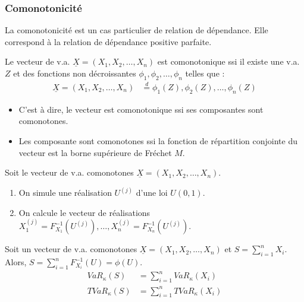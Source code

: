 \documentclass[10pt, french]{article}
\begin{document}
\begin{multicols*}{2}
\subsubsection{Comonotonicité}
La comonotonicité est un cas particulier de relation de dépendance. Elle correspond à la relation de dépendance positive parfaite.
\begin{definitionNOHFILLprop}[Comonotonicité]
Le vecteur de v.a. $\underline{X}	=	(X_{1}, X_{2}, \dots, X_{n})$ est comonotonique ssi il existe une v.a. $Z$ et des fonctions non décroissantes $\phi_{1}, \phi_{2}, \dots, \phi_{n}$ telles que :
\begin{align*}
	\underline{X}	
	=	(X_{1}, X_{2}, \dots, X_{n})
	&\overset{d}{=}	\phi_{1}(Z), \phi_{2}(Z), \dots, \phi_{n}(Z)
\end{align*}
\begin{itemize}
	\item	C'est à dire, le vecteur est comonotonique ssi ses composantes sont comonotones.
	\item	Les composante sont comonotones ssi la fonction de répartition conjointe du vecteur est la borne supérieure de Fréchet $M$.
\end{itemize}
\end{definitionNOHFILLprop}

\begin{algo2}
Soit le vecteur de v.a. comonotones $\underline{X}	=	(X_{1}, X_{2}, \dots, X_{n})$.
\begin{enumerate}
	\item	On simule une réalisation $U^{(j)}$ d'une loi $U(0, 1)$.
	\item	On calcule le vecteur de réalisations $X^{(j)}_{1}	=	F_{X_{1}}^{-1}(U^{(j)}), \dots, X^{(j)}_{n}	=	F_{X_{n}}^{-1}(U^{(j)})$.
\end{enumerate}
\end{algo2}

\begin{definitionNOHFILLpropos}
Soit un vecteur de v.a. comonotones $\underline{X}	=	(X_{1}, X_{2}, \dots, X_{n})$ et $S	=	\sum_{i = 1}^{n} X_{i}$.
Alors, $S	=	\sum_{i = 1}^{n}F_{X_{i}}^{-1}(U)	=	\phi(U)$.
\begin{align*}
	VaR_{\kappa}(S)	
	&=	\sum_{i = 1}^{n} VaR_{\kappa}(X_{i})	\\
	TVaR_{\kappa}(S)	
	&=	\sum_{i = 1}^{n} TVaR_{\kappa}(X_{i})
\end{align*}


\end{definitionNOHFILLpropos}
\end{multicols*}
\end{document}
